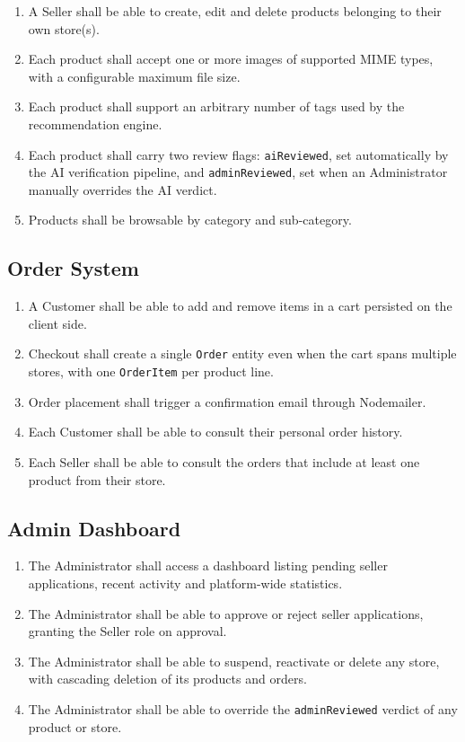 \documentclass[12pt, a4paper, oneside]{report}
\begin{document}
\begin{enumerate}[label=\textbf{FR-P\arabic*.},leftmargin=*,itemsep=2pt]
  \item A Seller shall be able to create, edit and delete products
        belonging to their own store(s).
  \item Each product shall accept one or more images of supported
        MIME types, with a configurable maximum file size.
  \item Each product shall support an arbitrary number of tags used
        by the recommendation engine.
  \item Each product shall carry two review flags: \texttt{aiReviewed},
        set automatically by the AI verification pipeline, and
        \texttt{adminReviewed}, set when an Administrator manually
        overrides the AI verdict.
  \item Products shall be browsable by category and sub-category.
\end{enumerate}

\subsection{Order System}

\begin{enumerate}[label=\textbf{FR-O\arabic*.},leftmargin=*,itemsep=2pt]
  \item A Customer shall be able to add and remove items in a cart
        persisted on the client side.
  \item Checkout shall create a single \texttt{Order} entity even
        when the cart spans multiple stores, with one
        \texttt{OrderItem} per product line.
  \item Order placement shall trigger a confirmation email through
        Nodemailer.
  \item Each Customer shall be able to consult their personal order
        history.
  \item Each Seller shall be able to consult the orders that include
        at least one product from their store.
\end{enumerate}

\subsection{Admin Dashboard}

\begin{enumerate}[label=\textbf{FR-D\arabic*.},leftmargin=*,itemsep=2pt]
  \item The Administrator shall access a dashboard listing pending
        seller applications, recent activity and platform-wide
        statistics.
  \item The Administrator shall be able to approve or reject seller
        applications, granting the Seller role on approval.
  \item The Administrator shall be able to suspend, reactivate or
        delete any store, with cascading deletion of its products
        and orders.
  \item The Administrator shall be able to override the
        \texttt{adminReviewed} verdict of any product or store.
\end{enumerate}
\end{document}
